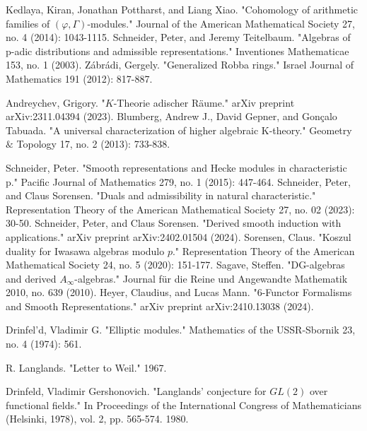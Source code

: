 \documentclass[12pt]{article}
\theoremstyle{definition}
\begin{document}
\begin{thebibliography}{}
 Kedlaya, Kiran, Jonathan Pottharst, and Liang Xiao. "Cohomology of arithmetic families of $(\varphi, \Gamma)$-modules." Journal of the American Mathematical Society 27, no. 4 (2014): 1043-1115.
 Schneider, Peter, and Jeremy Teitelbaum. "Algebras of p-adic distributions and admissible representations." Inventiones Mathematicae 153, no. 1 (2003).
 Z\'abr\'adi, Gergely. "Generalized Robba rings." Israel Journal of Mathematics 191 (2012): 817-887.


 Andreychev, Grigory. "$ K $-Theorie adischer R\"aume." arXiv preprint arXiv:2311.04394 (2023).
 Blumberg, Andrew J., David Gepner, and Gon\c{c}alo Tabuada. "A universal characterization of higher algebraic K-theory." Geometry $\&$ Topology 17, no. 2 (2013): 733-838.


 Schneider, Peter. "Smooth representations and Hecke modules in characteristic p." Pacific Journal of Mathematics 279, no. 1 (2015): 447-464.
 Schneider, Peter, and Claus Sorensen. "Duals and admissibility in natural characteristic." Representation Theory of the American Mathematical Society 27, no. 02 (2023): 30-50.
 Schneider, Peter, and Claus Sorensen. "Derived smooth induction with applications." arXiv preprint arXiv:2402.01504 (2024).
 Sorensen, Claus. "Koszul duality for Iwasawa algebras modulo $p$." Representation Theory of the American Mathematical Society 24, no. 5 (2020): 151-177.
 Sagave, Steffen. "DG-algebras and derived $A_\infty$-algebras." Journal f\"ur die Reine und Angewandte Mathematik 2010, no. 639 (2010).
 Heyer, Claudius, and Lucas Mann. "6-Functor Formalisms and Smooth Representations." arXiv preprint arXiv:2410.13038 (2024).

 Drinfel'd, Vladimir G. "Elliptic modules." Mathematics of the USSR-Sbornik 23, no. 4 (1974): 561. 

 R. Langlands. "Letter to Weil." 1967.

 Drinfeld, Vladimir Gershonovich. "Langlands' conjecture for $GL (2)$ over functional fields." In Proceedings of the International Congress of Mathematicians (Helsinki, 1978), vol. 2, pp. 565-574. 1980.


\end{thebibliography}
\end{document}

